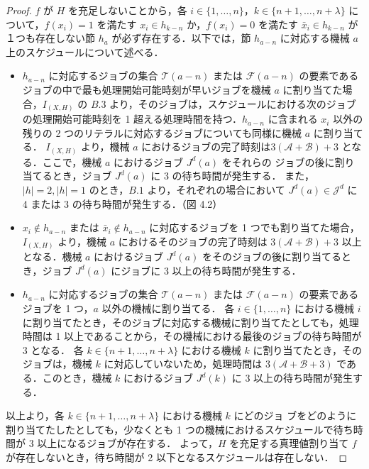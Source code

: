 \documentclass[12pt]{optlab-bachelor}
\begin{document}
\begin{proof}
  $f$ が $H$ を充足しないことから，各 $i \in \{1, \ldots,n\}$，$k \in \{n + 1,\ldots,n + \lambda\}$ について，$f(x_i) = 1$ を満たす $x_i \in h_{k - n}$ か，$f(x_i) = 0$ を満たす $\bar x_i \in h_{k - n}$ が１つも存在しない節 $h_a$ が必ず存在する．以下では，節 $h_{a - n}$ に対応する機械 $a$ 上のスケジュールについて述べる．
  \begin{itemize}
    \item $h_{a - n}$ に対応するジョブの集合 $\mathcal{T}(a - n)$ または $\mathcal{F}(a - n)$ の要素であるジョブの中で最も処理開始可能時刻が早いジョブを機械 $a$ に割り当てた場合，$I_{(X,H)}$ の $B.3$ より，そのジョブは，スケジュールにおける次のジョブの処理開始可能時刻を 1 超える処理時間を持つ．$h_{a - n}$ に含まれる $x_i$ 以外の残りの 2 つのリテラルに対応するジョブについても同様に機械 $a$ に割り当てる．
    $I_{(X,H)}$ より，機械 $a$ におけるジョブの完了時刻は$3(\mathcal{A} + \mathcal{B}) + 3$ となる．ここで，機械 $a$ におけるジョブ $J^d(a)$ をそれらの
    ジョブの後に割り当てるとき，ジョブ $J^d(a)$ に 3 の待ち時間が発生する．
    また，$|h| = 2,|h| = 1$ のとき，$B.1$ より，それぞれの場合において $J^d(a) \in \mathcal{J}^d$ に 4 または 3 の待ち時間が発生する．（図 4.2）

    \item $x_i \notin h_{a - n}$ または $\bar x_i \notin h_{a - n}$ に対応するジョブを 1 つでも割り当てた場合，$I_{(X,H)}$ より，機械 $a$ におけるそのジョブの完了時刻は $3(\mathcal{A} + \mathcal{B}) + 3$ 以上となる．機械 $a$ におけるジョブ $J^d(a)$ をそのジョブの後に割り当てるとき，ジョブ $J^d(a)$ にジョブに 3 以上の待ち時間が発生する．

    \item $h_{a - n}$ に対応するジョブの集合 $\mathcal{T}(a - n)$ または $\mathcal{F}(a - n)$ の要素であるジョブを 1 つ，$a$ 以外の機械に割り当てる．
    各 $i \in \{1,\ldots,n\}$ における機械 $i$ に割り当てたとき，そのジョブに対応する機械に割り当てたとしても，処理時間は 1 以上であることから，その機械における最後のジョブの待ち時間が 3 となる．
    各 $k \in \{ n + 1,\ldots,n + \lambda\}$ における機械 $k$ に割り当てたとき，そのジョブは，機械 $k$ に対応していないため，処理時間は $3(\mathcal{A} + \mathcal{B} + 3)$ である．このとき，機械 $k$ におけるジョブ $J^d(k)$ に 3 以上の待ち時間が発生する．
  \end{itemize}
  以上より，各 $k \in \{n + 1,\ldots,n + \lambda\}$ における機械 $k$ にどのジョ
  ブをどのように割り当てたしたとしても，少なくとも 1 つの機械におけるスケジュールで待ち時間が 3 以上になるジョブが存在する．
  よって，$H$ を充足する真理値割り当て $f$ が存在しないとき，待ち時間が 2 以下となるスケジュールは存在しない．
\end{proof}
\end{document}
